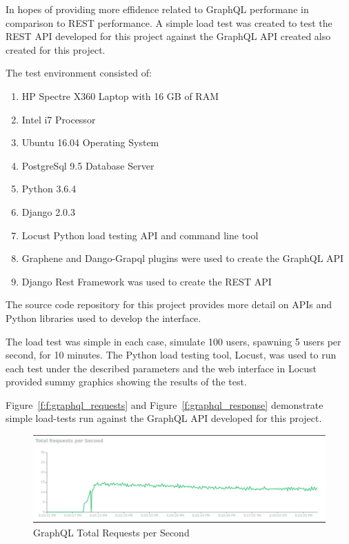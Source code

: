 In hopes of providing more effidence related to GraphQL performane in 
comparison to REST performance.  A simple load test was created to test 
the REST API developed for this project against the GraphQL API created also 
created for this project.

The test environment consisted of:
\begin{enumerate}
\item HP Spectre X360 Laptop with 16 GB of RAM
\item Intel i7 Processor
\item Ubuntu 16.04 Operating System
\item PostgreSql 9.5 Database Server
\item Python 3.6.4
\item Django 2.0.3
\item Locust Python load testing API and command line tool
\item Graphene and Dango-Grapql plugins were used to create the GraphQL API
\item Django Rest Framework was used to create the REST API
\end{enumerate}
The source code repository for this project provides more detail on APIs and 
Python libraries used to develop the interface.

The load test was simple in each case, simulate 100 users, spawning 5 users 
per second, for 10 minutes.  The Python load testing tool, Locust, was used 
to run each test under the described parameters and the web interface in 
Locust provided summy graphics showing the results of the test.

Figure~\ref{f:f:graphql_requests} and Figure~\ref{f:graphql_response} 
demonstrate simple load-tests run against the GraphQL API developed for this 
project.

\begin{figure}[htb]
  \centering\includegraphics[width=\columnwidth]
  {./images/graphql_requests.jpg}
  \caption{GraphQL Total Requests per Second}\label{f:graphql_requests}
\end{figure}

